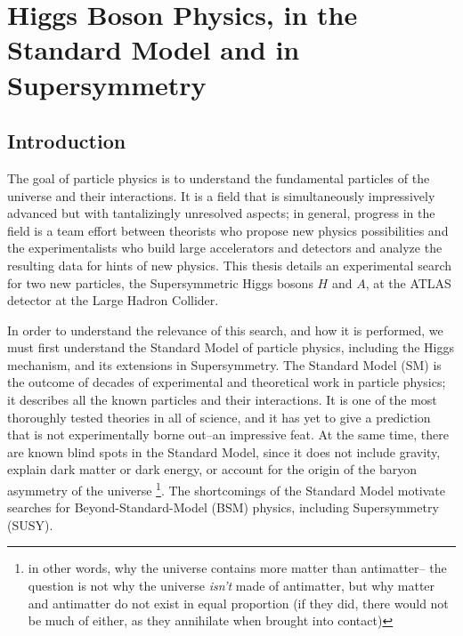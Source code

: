  

\chapter[Theory of Higgs Physics]{Higgs Boson Physics, in the Standard Model and in Supersymmetry}
\label{chapter:Theory}



\section{Introduction}
The goal of particle physics is to understand the fundamental particles of the universe and 
their interactions. It is a field that is simultaneously impressively advanced but 
with tantalizingly unresolved aspects; in general, progress in the field is a team 
effort between theorists who propose new physics possibilities and the experimentalists who build 
large accelerators and detectors and analyze the resulting data for hints of new physics. This thesis details 
an experimental search for two new particles, the Supersymmetric Higgs bosons $H$ 
and $A$, at the ATLAS detector at the Large Hadron Collider.

In order to understand the relevance of this search, and how it is performed, 
we must first understand the Standard Model of particle physics, including the Higgs mechanism, 
and its extensions in Supersymmetry.  The Standard Model (SM) is the outcome of decades of 
experimental and theoretical work in particle physics; it describes all the known particles and 
their interactions.  It is one of the most thoroughly tested theories in all of 
science, and it has yet to give a prediction that is not experimentally borne 
out--an impressive feat.  At the same time, there are known blind 
spots in the Standard Model, since it does not include gravity, explain dark 
matter or dark energy, or account for the origin of the baryon asymmetry of the universe
\footnote{in other words, why the universe contains more matter than antimatter--
the question is not why the universe \textit{isn't} made of antimatter, but why matter and antimatter
do not exist in equal proportion (if they did, there would not be much of either, as they 
annihilate when brought into contact)}. The shortcomings of the 
Standard Model motivate searches for Beyond-Standard-Model (BSM) physics, including Supersymmetry (SUSY).  



